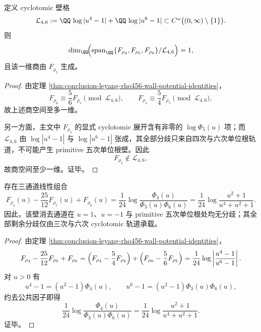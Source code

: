 \begin{theorem}[剔除四次与六次壁后的秩一塌缩]\label{thm:conclusion-leyang-rho456-rank-one-collapse-mod-walls}
定义 cyclotomic 壁格
\[
\mathcal L_{4,6}:=\QQ\,\log|u^4-1|+\QQ\,\log|u^6-1|
\subset C^\omega\bigl((0,\infty)\setminus\{1\}\bigr).
\]
则
\[
\dim_{\QQ}\!\Bigl(
\operatorname{span}_{\QQ}\{F_{\rho_4},F_{\rho_5},F_{\rho_6}\}/\mathcal L_{4,6}
\Bigr)=1,
\]
且该一维商由 \(F_{\rho_5}\) 生成。
\end{theorem}
\begin{proof}
由定理 \ref{thm:conclusion-leyang-rho456-wall-potential-identities}，
\[
F_{\rho_6}\equiv \frac56F_{\rho_5}\pmod{\mathcal L_{4,6}},
\qquad
F_{\rho_4}\equiv \frac54F_{\rho_5}\pmod{\mathcal L_{4,6}},
\]
故上述商空间至多一维。

另一方面，主文中 \(F_{\rho_5}\) 的显式 cyclotomic 展开含有非零的 \(\log\Phi_5(u)\) 项；而 \(\mathcal L_{4,6}\) 由 \(\log|u^4-1|\) 与 \(\log|u^6-1|\) 张成，其全部分歧只来自四次与六次单位根轨道，不可能产生 primitive 五次单位根壁。因此
\[
F_{\rho_5}\notin \mathcal L_{4,6},
\]
故商空间至少一维。证毕。
\end{proof}

\begin{corollary}[同时消去 \texorpdfstring{$u=1$}{u=1}、\texorpdfstring{$u=-1$}{u=-1} 与 primitive 五次壁的三通道组合]\label{cor:conclusion-leyang-rho456-wall-cancel-channel}
存在三通道线性组合
\[
F_{\rho_4}(u)-\frac{25}{12}F_{\rho_5}(u)+F_{\rho_6}(u)
=
\frac1{24}\log\frac{\Phi_4(u)}{\Phi_3(u)\Phi_6(u)}
=
\frac1{24}\log\frac{u^2+1}{u^4+u^2+1}.
\]
因此，该壁消去通道在 \(u=1\)、\(u=-1\) 与 primitive 五次单位根处均无分歧；其全部剩余分歧仅由三次与六次 cyclotomic 轨道承载。
\end{corollary}
\begin{proof}
由定理 \ref{thm:conclusion-leyang-rho456-wall-potential-identities}，
\[
F_{\rho_4}-\frac{25}{12}F_{\rho_5}+F_{\rho_6}
=
\Bigl(F_{\rho_4}-\frac54F_{\rho_5}\Bigr)
+
\Bigl(F_{\rho_6}-\frac56F_{\rho_5}\Bigr)
=
\frac1{24}\log\left|\frac{u^4-1}{u^6-1}\right|.
\]
对 \(u>0\) 有
\[
u^4-1=(u^2-1)\Phi_4(u),
\qquad
u^6-1=(u^2-1)\Phi_3(u)\Phi_6(u),
\]
约去公共因子即得
\[
\frac1{24}\log\frac{\Phi_4(u)}{\Phi_3(u)\Phi_6(u)}
=
\frac1{24}\log\frac{u^2+1}{u^4+u^2+1}.
\]
证毕。
\end{proof}

